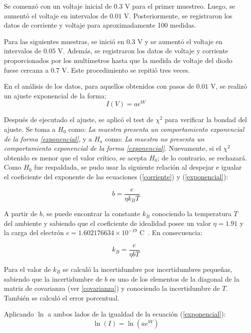 \documentclass[twocolumn]{article} %
\begin{document}
Se comenzó con un voltaje inicial de $0.3$ V para el primer muestreo. Luego, se aumentó el voltaje en intervalos de $0.01$ V. Posteriormente, se registraron los datos de corriente y voltaje para aproximadamente 100 medidas.

Para las siguientes muestras, se inició en $0.3$ V y se aumentó el voltaje en intervalos de $0.05$ V. Además, se registraron los datos de voltaje y corriente proporcionados por los multímetros hasta que la medida de voltaje del diodo fuese cercana a $0.7$ V. Este procedimiento se repitió tres veces.

En el análisis de los datos, para aquellos obtenidos con pasos de $0.01$ V, se realizó un ajuste exponencial de la forma:
\begin{equation}
    I(V) = a e^{bV}
    \label{exponencial}
\end{equation}

Después de ejecutado el ajuste, se aplicó el test de $\chi^2$ para verificar la bondad del ajuste. Se toma a $H_0$ como: \textit{La muestra presenta un comportamiento exponencial de la forma \ref{exponencial}}, y a $H_a$ como: \textit{La muestra no presenta un comportamiento exponencial de la forma \ref{exponencial}}. Nuevamente, si el $\chi^2$ obtenido es menor que el valor crítico, se acepta $H_0$; de lo contrario, se rechazará. Como $H_0$ fue respaldada, se pudo usar la siguiente relación al despejar e igualar el coeficiente del exponente de las ecuaciones (\ref{corriente}) y (\ref{exponencial}):

\begin{equation}
b = \frac{e}{\eta k_B T}
\end{equation}

A partir de $b$, se puede encontrar la constante $k_B$ conociendo la temperatura $T$ del ambiente y sabiendo que el coeficiente de idealidad posee un valor $\eta = 1.91$ y la carga del electrón $e = 1.602176634\times10^{-19}$ C~\cite{Stock2019}. En consecuencia:

\begin{equation*}
    k_B = \frac{e}{\eta b T}
    \label{Valor: kb}
\end{equation*}

Para el valor de $k_B$ se calculó la incertidumbre por incertidumbres pequeñas, sabiendo que la incertidumbre de $b$ es uno de los elementos de la diagonal de la matriz de covarianza (ver \ref{covarianza}) y conociendo la incertidumbre de $T$. También se calculó el error porcentual.

Aplicando $\ln$ a ambos lados de la igualdad de la ecuación (\ref{exponencial}):
\[ \ln(I) = \ln(a e^{bV}) \]
\end{document}
